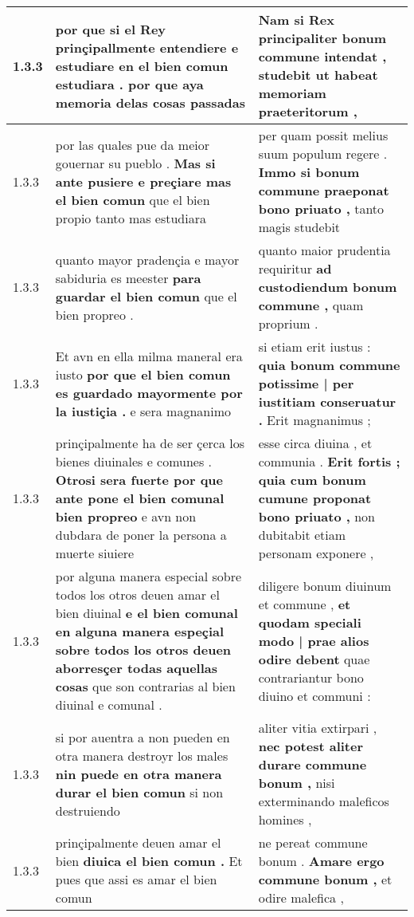 \begin{tabular}{|p{1cm}|p{6.5cm}|p{6.5cm}|}
1.3.3 & por que si el Rey prinçipallmente entendiere \textbf{ e estudiare en el bien comun estudiara . } por que aya memoria delas cosas passadas & Nam si Rex principaliter bonum commune intendat , \textbf{ studebit } ut habeat memoriam praeteritorum , \\\hline
1.3.3 & por las quales pue da meior gouernar su pueblo . \textbf{ Mas si ante pusiere e preçiare mas el bien comun } que el bien propio tanto mas estudiara & per quam possit melius suum populum regere . \textbf{ Immo si bonum commune praeponat bono priuato , } tanto magis studebit \\\hline
1.3.3 & quanto mayor pradençia e mayor sabiduria es meester \textbf{ para guardar el bien comun } que el bien propreo . & quanto maior prudentia requiritur \textbf{ ad custodiendum bonum commune , } quam proprium . \\\hline
1.3.3 & Et avn en ella milma maneral era iusto \textbf{ por que el bien comun es guardado mayormente por la iustiçia . } e sera magnanimo & si etiam erit iustus : \textbf{ quia bonum commune potissime | per iustitiam conseruatur . } Erit magnanimus ; \\\hline
1.3.3 & prinçipalmente ha de ser çerca los bienes diuinales e comunes . \textbf{ Otrosi sera fuerte por que ante pone el bien comunal bien propreo } e avn non dubdara de poner la persona a muerte siuiere & esse circa diuina , et communia . \textbf{ Erit fortis ; quia cum bonum cumune proponat bono priuato , } non dubitabit etiam personam exponere , \\\hline
1.3.3 & por alguna manera especial sobre todos los otros deuen amar el bien diuinal \textbf{ e el bien comunal en alguna manera espeçial sobre todos los otros deuen aborresçer todas aquellas cosas } que son contrarias al bien diuinal e comunal . & diligere bonum diuinum et commune , \textbf{ et quodam speciali modo | prae alios odire debent } quae contrariantur bono diuino et communi : \\\hline
1.3.3 & si por auentra a non pueden en otra manera destroyr los males \textbf{ nin puede en otra manera durar el bien comun } si non destruiendo & aliter vitia extirpari , \textbf{ nec potest aliter durare commune bonum , } nisi exterminando maleficos homines , \\\hline
1.3.3 & prinçipalmente deuen amar el bien \textbf{ diuica el bien comun . } Et pues que assi es amar el bien comun & ne pereat commune bonum . \textbf{ Amare ergo commune bonum , } et odire malefica , \\\hline

\end{tabular}
